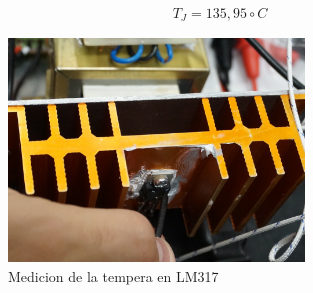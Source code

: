 \begin{equation}
  \begin{aligned}
    T_J = 135,95 \circ C
  \end{aligned}
\end{equation}

   
\begin{figure}[H]
  \centering
  \includegraphics[width=0.70\textwidth]{images/medicionTemperatura.png}
  \caption{Medicion de la tempera en LM317}
\end{figure}

